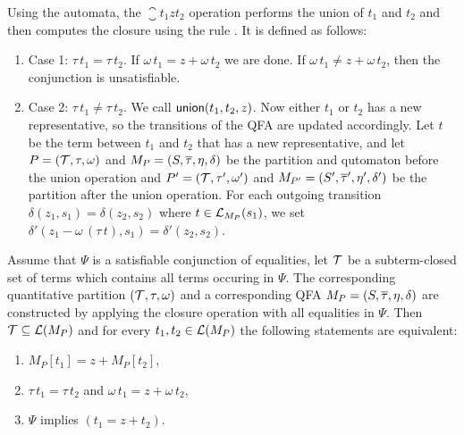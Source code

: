 Using the automata, the $\closure{t_1}{z}{t_2}$  operation performs the union of $t_1$ and $t_2$ and
then computes the closure using the rule .
It is defined as follows:

\begin{enumerate}
  \item Case 1: $\tau\,t_1 = \tau\,t_2$. If $\omega\,t_1 = z + \omega\,t_2$ we are done.
        If $\omega\,t_1 \neq z + \omega\,t_2$, then the conjunction is unsatisfiable.
  \item Case 2: $\tau\,t_1 \neq \tau\,t_2$. We call $\textsf{union}(t_1, t_2, z)$.
        Now either $t_1$ or $t_2$ has a new representative, so the transitions of the QFA are updated accordingly.
        Let $t$ be the term between $t_1$ and $t_2$ that has a new representative,
        and let $P = (\mathcal{T}, \tau, \omega)$ and $M_P = (S, \overline{\tau}, \eta, \delta)$ be the partition and qutomaton before the union operation
        and $P' = (\mathcal{T}, \tau', \omega')$ and $M_{P'} = (S', \overline{\tau}', \eta', \delta')$ be the partition after the union operation.
        For each outgoing transition $\delta(z_1, s_1) = \delta(z_2, s_2)$ where $t \in \mathcal{L}_{M_P}(s_1)$,
        we set $\delta'(z_1 - \omega\,(\tau\,t), s_1) = \delta'(z_2, s_2)$.
\end{enumerate}



\begin{theorem}
  Assume that $\Psi$ is a satisfiable conjunction of equalities, let $\mathcal{T}$ be a subterm-closed set of terms which contains all terms occuring in $\Psi$.
  The corresponding quantitative partition $(\mathcal{T}, \tau,\omega)$ and a corresponding QFA $M_P = (S, \overline{\tau}, \eta, \delta)$ are constructed by applying the closure operation with all equalities in $\Psi$.
  Then $\mathcal{T} \subseteq \mathcal{L}(M_P)$ and for every $t_1, t_2 \in \mathcal{L}(M_P)$ the following statements are equivalent:
  \begin{enumerate}
    \item $M_P[t_1] = z + M_P[t_2]$,
    \item $\tau\,t_1 = \tau\,t_2$ and $\omega\,t_1 = z + \omega\,t_2$,
    \item $\Psi$ implies $(t_1 = z + t_2)$.
  \end{enumerate}
\end{theorem}

